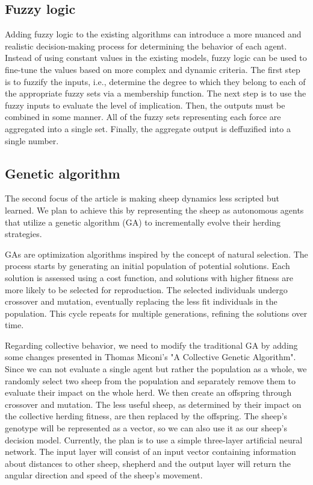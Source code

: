 \documentclass[9pt]{pnas-new}
\begin{document}
\subsection{Fuzzy logic}
Adding fuzzy logic to the existing algorithms can introduce a more nuanced and realistic decision-making process for determining the behavior of each agent.
Instead of using constant values in the existing models, fuzzy logic can be used to fine-tune the values based on more complex and dynamic criteria.
The first step is to fuzzify the inputs, i.e., determine the degree to which they belong to each of the appropriate fuzzy sets via a membership function.
The next step is to use the fuzzy inputs to evaluate the level of implication.
Then, the outputs must be combined in some manner. All of the fuzzy sets representing each force are aggregated into a single set. Finally, the aggregate output is deffuzified into a single number.

\subsection{Genetic algorithm}
The second focus of the article is making sheep dynamics less scripted but learned. We plan to achieve this by representing the sheep as autonomous agents that utilize a genetic algorithm (GA) to incrementally evolve their herding strategies. 

GAs are optimization algorithms inspired by the concept of natural selection. The process starts by generating an initial population of potential solutions. Each solution is assessed using a cost function, and solutions with higher fitness are more likely to be selected for reproduction. The selected individuals undergo crossover and mutation, eventually replacing the less fit individuals in the population. This cycle repeats for multiple generations, refining the solutions over time.

Regarding collective behavior, we need to modify the traditional GA by adding some changes presented in Thomas Miconi's "A Collective Genetic Algorithm"\cite{miconi2001collective}. Since we can not evaluate a single agent but rather the population as a whole, we randomly select two sheep from the population and separately remove them to evaluate their impact on the whole herd. We then create an offspring through crossover and mutation. The less useful sheep, as determined by their impact on the collective herding fitness, are then replaced by the offspring. The sheep's genotype will be represented as a vector, so we can also use it as our sheep's decision model. Currently, the plan is to use a simple three-layer artificial neural network. The input layer will consist of an input vector containing information about distances to other sheep, shepherd and the output layer will return the angular direction and speed of the sheep's movement. 
\end{document}
